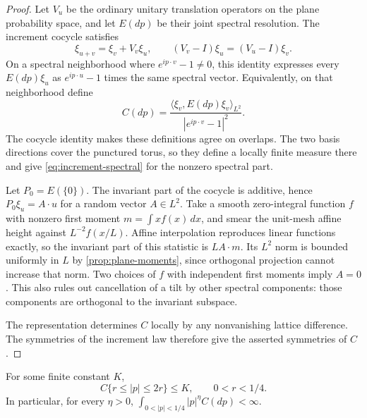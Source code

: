 \begin{proof}
Let \(V_u\) be the ordinary unitary translation operators on the plane
probability space, and let \(E(dp)\) be their joint spectral resolution. The
increment cocycle satisfies
\[
 \xi_{u+v}=\xi_v+V_v\xi_u,
 \qquad (V_v-I)\xi_u=(V_u-I)\xi_v.
\]
On a spectral neighborhood where \(e^{ip\cdot v}-1\ne0\), this identity
expresses every \(E(dp)\xi_u\) as \(e^{ip\cdot u}-1\) times the same spectral
vector. Equivalently, on that neighborhood define
\[
 C(dp)=\frac{\langle\xi_v,E(dp)\xi_v\rangle_{L^2}}
                  {|e^{ip\cdot v}-1|^2}.
\]
The cocycle identity makes these definitions agree on overlaps. The two basis
directions cover the punctured torus, so they define a locally finite measure
there and give \cref{eq:increment-spectral} for the nonzero spectral part.

Let \(P_0=E(\{0\})\). The invariant part of the cocycle is additive, hence
\(P_0\xi_u=A\cdot u\) for a random vector \(A\in L^2\). Take a smooth
zero-integral function \(f\) with nonzero first moment \(m=\int x f(x)\,dx\),
and smear the unit-mesh affine height against \(L^{-2}f(x/L)\). Affine
interpolation reproduces linear functions exactly, so the invariant part of
this statistic is \(L A\cdot m\). Its \(L^2\) norm is bounded uniformly in
\(L\) by \cref{prop:plane-moments}, since orthogonal projection cannot
increase that norm. Two choices of \(f\) with independent first moments imply
\(A=0\). This also rules out cancellation of a tilt by other spectral
components: those components are orthogonal to the invariant subspace.

The representation determines \(C\) locally by any nonvanishing lattice
difference. The symmetries of the increment law therefore give the asserted
symmetries of \(C\).
\end{proof}

\begin{lemma}
\label{lem:annulus-mass}
For some finite constant \(K\),
\begin{equation}
 \label{eq:annulus-mass}
 C\{r\le |p|\le2r\}\le K,\qquad 0<r<1/4.
\end{equation}
In particular, for every \(\eta>0\),
\(\int_{0<|p|<1/4}|p|^\eta C(dp)<\infty\).
\end{lemma}

